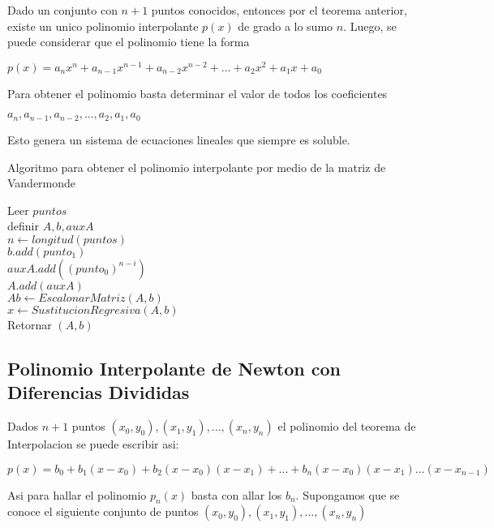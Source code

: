 \documentclass[12pt]{article}
\begin{document}
        Dado un conjunto con $n + 1$ puntos conocidos, entonces por el teorema anterior, existe un unico polinomio interpolante $p(x)$ de grado a lo sumo $n$. Luego, se puede considerar que el polinomio tiene la forma
    
        \begin{center}
            $p(x) = a_nx^n + a_{n-1}x^{n-1} + a_{n-2}x^{n-2} + ... + a_2x^2 + a_1x + a_0$\\
        \end{center}
            

        Para obtener el polinomio basta determinar el valor de todos los coeficientes
        \begin{center}
            $a_n, a_{n-1}, a_{n-2}, ..., a_2, a_1, a_0$\\
        \end{center}
        Esto genera un sistema de ecuaciones lineales que siempre es soluble.
        
        \begin{algorithm}[H]
            \caption{Algoritmo para obtener el polinomio interpolante por medio de la matriz de Vandermonde}
            Leer $puntos$\\
            definir $A, b, auxA$\\
            $n \leftarrow longitud(puntos)$\\
            {
                $b.add(punto_{1})$\\
                {
                    $auxA.add((punto_{0})^{n-i})$\\
                }
                $A.add(auxA)$\\
            }
            $Ab \leftarrow EscalonarMatriz(A, b)$\\
            $x \leftarrow SustitucionRegresiva(A, b)$\\
            Retornar $(A, b)$\\
        \end{algorithm}

        \subsection{Polinomio Interpolante de Newton con Diferencias Divididas}
        Dados $n + 1$ puntos $(x_0, y_0), (x_1, y_1) , ..., (x_n, y_n)$ el polinomio del teorema de Interpolacion se puede escribir asi:  
        \begin{center}
            $p(x) = b_0 + b_1(x - x_0) + b_2(x - x_0)(x - x_1) + ... + b_n(x - x_0)(x - x_1) ... (x - x_{n-1})$\\
        \end{center}
        Asi para hallar el polinomio $p_n(x)$ basta con allar los $b_n$.
        Supongamos que se conoce el siguiente conjunto de puntos ${(x_0, y_0), (x_1, y_1) , ..., (x_n, y_n)}$\\
        
\end{document}
